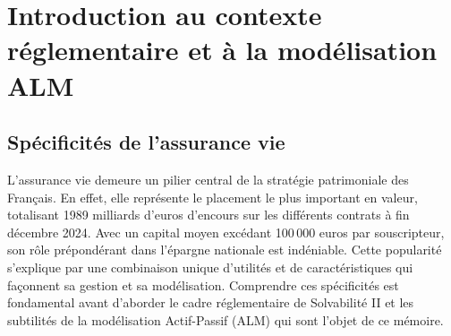 \chapter{Introduction au contexte réglementaire et à la modélisation ALM}



\section{Spécificités de l'assurance vie}
\label{sec:specificites_assurance_vie}

L'assurance vie demeure un pilier central de la stratégie patrimoniale des Français. En effet, elle représente le placement le plus important en valeur, totalisant 1989 milliards d’euros d’encours sur les différents contrats à fin décembre 2024. Avec un capital moyen excédant 100\,000 euros par souscripteur, son rôle prépondérant dans l'épargne nationale est indéniable. Cette popularité s'explique par une combinaison unique d'utilités et de caractéristiques qui façonnent sa gestion et sa modélisation. Comprendre ces spécificités est fondamental avant d'aborder le cadre réglementaire de Solvabilité II et les subtilités de la modélisation Actif-Passif (ALM) qui sont l'objet de ce mémoire.

